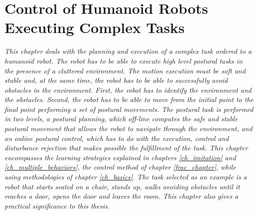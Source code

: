 \chapter{Control of Humanoid Robots Executing Complex Tasks}\label{ch_postural_control}
\textit{This chapter deals with the planning and execution of a complex task ordered to a humanoid robot. The robot has to be able to execute high level postural tasks in the presence of a cluttered environment. The motion execution must be soft and stable and, at the same time, the robot has to be able to successfully avoid obstacles in the environment. First, the robot has to identify the environment and the obstacles. Second, the robot has to be able to move from the initial point to the final point performing a set of postural movements. The postural task is performed in two levels, a postural planning, which off-line computes  the  safe and stable postural movement that allows the robot to  navigate through the environment, and an online postural control, which has to do with the execution, control and disturbance rejection that makes possible the fulfillment of the task. This chapter encompasses the learning strategies explained in chapters \ref{ch_imitation} and \ref{ch_multiple_behaviors}, the control method of chapter \ref{frac_chapter}, while using methodologies of chapter \ref{ch_basics}. The task selected as an example is a robot that starts seated on a chair, stands up, walks avoiding obstacles until it reaches a door, opens the door and leaves the room. This chapter also gives a practical significance to this thesis. }
\newpage







